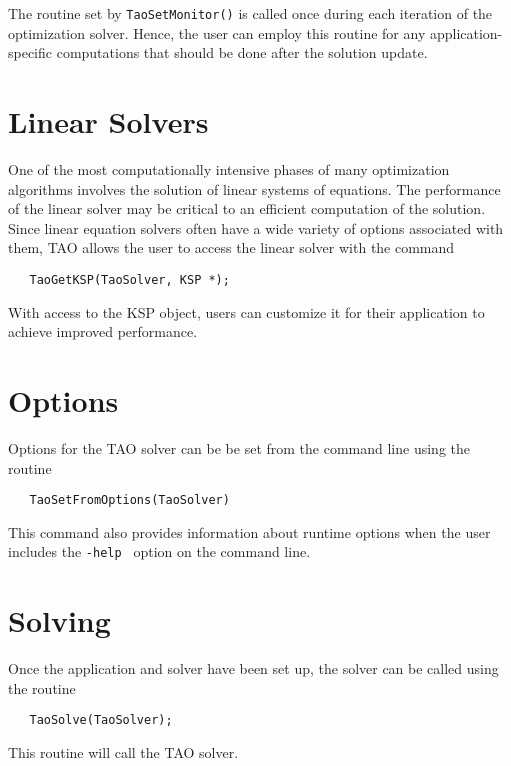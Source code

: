 The routine set by {\tt TaoSetMonitor()} is called once during each
iteration of the optimization solver.  Hence, the user can employ this 
routine for any application-specific computations that should be done 
after the solution update. 


\section{Linear Solvers}\label{sec:TaoLinearSolvers}
One of the most computationally intensive phases of many optimization
algorithms involves the solution of linear systems of equations.  
The performance of the linear solver may be critical to an efficient 
computation of the solution.  Since linear equation solvers often have 
a wide variety of options associated with them, TAO allows the user to 
access the linear solver with the command

\begin{verbatim}
   TaoGetKSP(TaoSolver, KSP *);
\end{verbatim}

\noindent
With access to the KSP object, users can customize it for their application
to achieve improved performance.

\section{Options}
Options for the TAO solver 
can be be set from the command line using the routine  
\begin{verbatim}
   TaoSetFromOptions(TaoSolver)
\end{verbatim}
This command also provides information about runtime options when the
user includes the {\tt -help } option on the command line.


\section{Solving}
Once the application and solver have been set up, the solver can be 
 called using the routine
\begin{verbatim}
   TaoSolve(TaoSolver);
\end{verbatim}
\noindent
This routine will call the TAO solver. 

